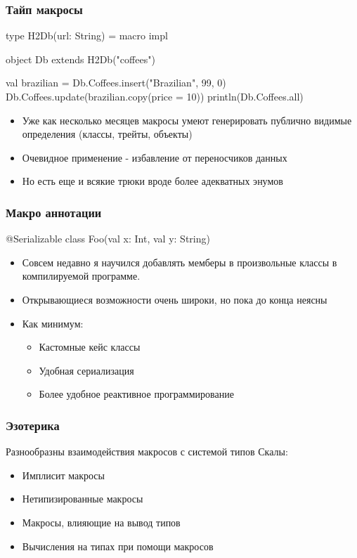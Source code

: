 \documentclass[svgnames,hyperref={bookmarks=false}]{beamer}
\begin{document}
\begin{frame}[fragile]
\frametitle{Тайп макросы}

\begin{semiverbatim}
type H2Db(url: String) = macro impl

object Db extends H2Db("coffees")

val brazilian = Db.Coffees.insert("Brazilian", 99, 0)
Db.Coffees.update(brazilian.copy(price = 10))
println(Db.Coffees.all)
\end{semiverbatim}

\begin{itemize}
\item Уже как несколько месяцев макросы умеют генерировать публично видимые определения (классы, трейты, объекты)
\item Очевидное применение - избавление от переносчиков данных
\item Но есть еще и всякие трюки вроде более адекватных энумов
\end{itemize}
\end{frame}

\begin{frame}[fragile]
\frametitle{Макро аннотации}

\begin{semiverbatim}
@Serializable
class Foo(val x: Int, val y: String)
\end{semiverbatim}

\begin{itemize}
\item Совсем недавно я научился добавлять мемберы в произвольные классы в компилируемой программе.
\item Открывающиеся возможности очень широки, но пока до конца неясны
\item Как минимум:
\begin{itemize}
\item Кастомные кейс классы
\item Удобная сериализация
\item Более удобное реактивное программирование
\end{itemize}
\end{itemize}
\end{frame}

\begin{frame}[fragile]
\frametitle{Эзотерика}

Разнообразны взаимодействия макросов с системой типов Скалы:
\begin{itemize}
\item Имплисит макросы
\item Нетипизированные макросы
\item Макросы, влияющие на вывод типов
\item Вычисления на типах при помощи макросов
\end{itemize}
\end{frame}
\end{document}
